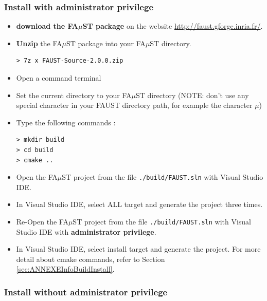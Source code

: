 \subsubsection{Install with administrator privilege}
\label{sec:AdminWinVisualStudioBasicInstall}
\begin{itemize}
\item \textbf{download the FA$\mu$ST package} on the website  \url{http://faust.gforge.inria.fr/}. 
\item \textbf{Unzip} the FA$\mu$ST package into your FA$\mu$ST directory. 
\begin{lstlisting}
> 7z x FAUST-Source-2.0.0.zip
\end{lstlisting}
\item Open a command terminal
\item Set the current directory to your FA$\mu$ST directory (NOTE: don't use any special character in your FAUST directory path, for example the character $\mu$)
\item Type the following commands : 
\begin{lstlisting}
> mkdir build
> cd build
> cmake .. 
\end{lstlisting}
\item Open the FA$\mu$ST project from the file \texttt{./build/FAUST.sln} with Visual Studio IDE.
\item In Visual Studio IDE, select ALL target and generate the project three times.
\item Re-Open the FA$\mu$ST project from the file \texttt{./build/FAUST.sln} with Visual Studio IDE with \textbf{administrator privilege}.
\item In Visual Studio IDE, select install target and generate the project.
For more detail about cmake commands, refer to Section \ref{sec:ANNEXEInfoBuildInstall}.
\end{itemize}

 
\subsubsection{Install without administrator privilege}
\label{sec:NoAdminWinVisualStudioBasicInstall}

